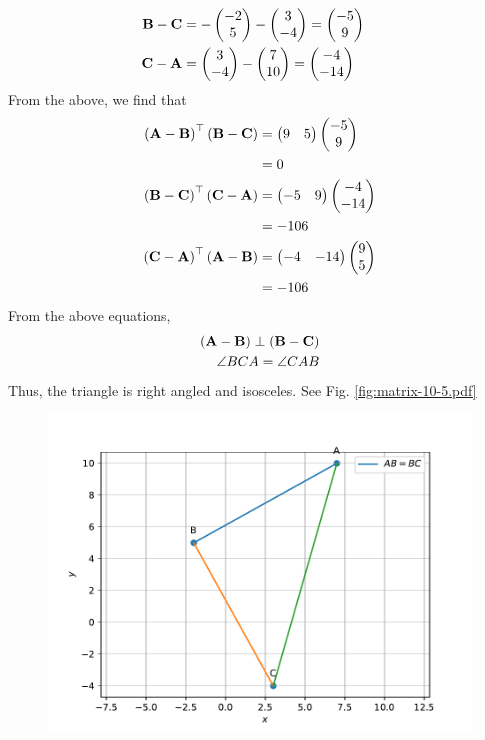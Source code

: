 \documentclass[journal,12pt,twocolumn]{IEEEtran}
\begin{document}
\begin{enumerate}
\begin{align}
			\\
			\mathbf{B} -\mathbf{C}&=  -\begin{pmatrix}-2 \\ 5\end{pmatrix}-\begin{pmatrix}3 \\ -4\end{pmatrix} = \begin{pmatrix}-5 \\ 9\end{pmatrix}
			\\
			\mathbf{C} -\mathbf{A}&= \begin{pmatrix}3 \\ -4\end{pmatrix} -\begin{pmatrix}7 \\ 10\end{pmatrix} = \begin{pmatrix}-4 \\ -14\end{pmatrix}
		\end{align}
		From the above,  we find that 
		\begin{align}
			\left(\mathbf{A} -\mathbf{B}\right)^{\top}\left(\mathbf{B} -\mathbf{C}\right)&=  \begin{pmatrix}9 & 5\end{pmatrix}\begin{pmatrix}-5 \\ 9\end{pmatrix}
			\\
			&=0
			\\
			\left(\mathbf{B} -\mathbf{C}\right)^{\top}\left(\mathbf{C} -\mathbf{A}\right)&=  \begin{pmatrix}-5 & 9\end{pmatrix}\begin{pmatrix}-4 \\ -14\end{pmatrix}
\\
			&=-106
			\\
			\left(\mathbf{C} -\mathbf{A}\right)^{\top}\left(\mathbf{A} -\mathbf{B}\right)&=  \begin{pmatrix}-4 & -14\end{pmatrix}\begin{pmatrix}9 \\ 5\end{pmatrix}
\\
			&=-106
		\end{align}
		From  the above equations, 
		\begin{align}
			\left(\mathbf{A} -\mathbf{B}\right)\perp \left(\mathbf{B} -\mathbf{C}\right)
			\\
			\angle BCA = 
			\angle CAB  
		\end{align}
		Thus, the triangle is right angled and isosceles.
    See Fig. 
	  \ref{fig:matrix-10-5.pdf}
  \begin{figure}
	  \centering 
	  \includegraphics[width=\columnwidth]{figs/matrix-10-5.pdf}

\end{figure}
\end{enumerate}
\end{document}
